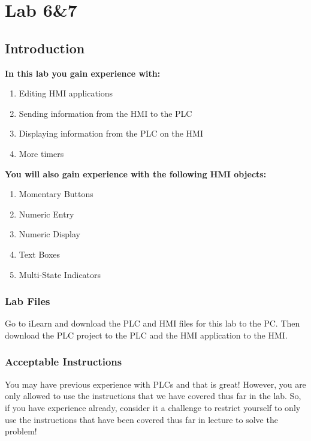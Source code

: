 \chapter{Lab 6\&7}
\setcounter{TASignatures}{0}
\setcounter{AsideCounter}{0}

\section{Introduction}
    \vspace{0.1em}

    \textbf{In this lab you gain experience with:}
    \begin{enumerate}
        \item Editing HMI applications
        \item Sending information from the HMI to the PLC
        \item Displaying information from the PLC on the HMI
        \item More timers
    \end{enumerate}
    
    \textbf{You will also gain experience with the following HMI objects:}
    
    \begin{enumerate}
        \item Momentary Buttons
        \item Numeric Entry
        \item Numeric Display
        \item Text Boxes
        \item Multi-State Indicators
    \end{enumerate}

\subsection{Lab Files}

Go to iLearn and download the PLC and HMI files for this lab to the PC. Then download the PLC project to the PLC and the HMI application to the HMI. 

\subsection{Acceptable Instructions}

You may have previous experience with PLCs and that is great! However, you are only allowed to use the instructions that we have covered thus far in the lab. So, if you have experience already, consider it a challenge to restrict yourself to only use the instructions that have been covered thus far in lecture to solve the problem!

